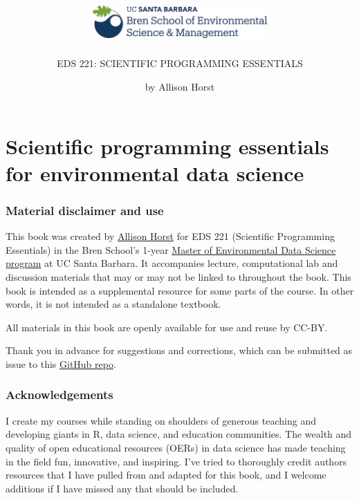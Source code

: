 \documentclass[
]{book}
\title{\includegraphics[width=0.5\textwidth,height=\textheight]{images/bren_logo_sm.png}}
\subtitle{EDS 221: SCIENTIFIC PROGRAMMING ESSENTIALS}
\author{by Allison Horst}
\date{}
\begin{document}
\maketitle

{
\setcounter{tocdepth}{1}
\tableofcontents
}
\hypertarget{scientific-programming-essentials-for-environmental-data-science}{%
\chapter{Scientific programming essentials for environmental data science}\label{scientific-programming-essentials-for-environmental-data-science}}

\hypertarget{material-disclaimer-and-use}{%
\subsection*{Material disclaimer and use}\label{material-disclaimer-and-use}}

This book was created by \href{www.allisonhorst.com}{Allison Horst} for EDS 221 (Scientific Programming Essentials) in the Bren School's 1-year \href{https://bren.ucsb.edu/masters-programs/master-environmental-data-science}{Master of Environmental Data Science program} at UC Santa Barbara. It accompanies lecture, computational lab and discussion materials that may or may not be linked to throughout the book. This book is intended as a supplemental resource for some parts of the course. In other words, it is not intended as a standalone textbook.

All materials in this book are openly available for use and reuse by CC-BY.

Thank you in advance for suggestions and corrections, which can be submitted as issue to this \href{https://github.com/allisonhorst/eds-221}{GitHub repo}.

\hypertarget{acknowledgements}{%
\subsection*{Acknowledgements}\label{acknowledgements}}

I create my courses while standing on shoulders of generous teaching and developing giants in R, data science, and education communities. The wealth and quality of open educational resources (OERs) in data science has made teaching in the field fun, innovative, and inspiring. I've tried to thoroughly credit authors resources that I have pulled from and adapted for this book, and I welcome additions if I have missed any that should be included.
\end{document}
